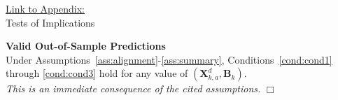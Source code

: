 \documentclass[static]{JJH-Beamer}
\begin{document}
\clearpage

\begin{frame}

\hypertarget{ret:creamcheese}{}
\begin{center}
\hyperlink{creamcheese}{\underline{Link to Appendix:}}\\
\vspace{1.5mm}
Tests of Implications
\end{center}

\end{frame}

\begin{frame}

\setcounter{theorem}{0}
\begin{theorem}\label{theorem:main} \textbf{Valid Out-of-Sample Predictions} \\
Under Assumptions~\ref{ass:alignment}-\ref{ass:summary}, Conditions~\ref{cond:cond1} through \ref{cond:cond3} hold for any value of $\left( \bm{X}^d_{k,a}, \bm{B}_k \right)$. \\
\emph{This is an immediate consequence of the cited assumptions.} $\Box$
\end{theorem}

\end{frame}
\end{document}

